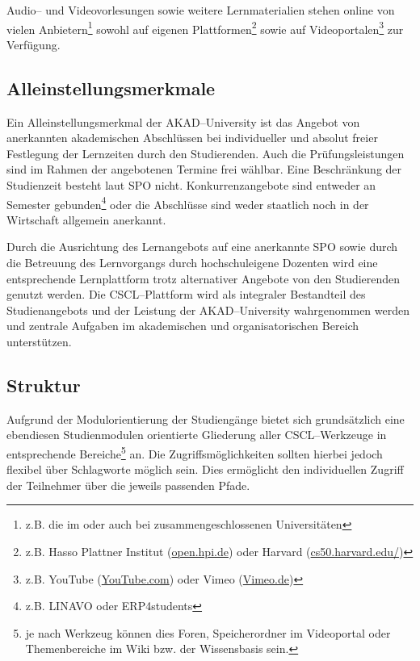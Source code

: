 Audio– und Videovorlesungen sowie weitere Lernmaterialien stehen online von vielen Anbietern\footnote{z.B. die im  oder auch bei  zusammengeschlossenen Universitäten} sowohl auf eigenen Plattformen\footnote{z.B. Hasso Plattner Institut (\url{open.hpi.de}) oder Harvard (\url{cs50.harvard.edu/})} sowie auf Videoportalen\footnote{z.B. YouTube (\url{YouTube.com}) oder Vimeo (\url{Vimeo.de})} zur Verfügung.

\subsection{Alleinstellungsmerkmale} %
\label{sub:alleinstellungsmerkmale_plazierung}
Ein Alleinstellungsmerkmal der AKAD–University ist das Angebot von anerkannten akademischen Abschlüssen bei individueller und absolut freier Festlegung der Lernzeiten durch den Studierenden. Auch die Prüfungsleistungen sind im Rahmen der angebotenen Termine frei wählbar. Eine Beschränkung der Studienzeit besteht laut \ac{SPO} nicht. Konkurrenzangebote sind entweder an Semester gebunden\footnote{z.B. \ac{LINAVO} oder ERP4students} oder die Abschlüsse sind weder staatlich noch in der Wirtschaft allgemein anerkannt.

Durch die Ausrichtung des Lernangebots auf eine anerkannte \ac{SPO} sowie durch die Betreuung des Lernvorgangs durch hochschuleigene Dozenten wird eine entsprechende Lernplattform trotz alternativer Angebote von den Studierenden genutzt werden. Die \ac{CSCL}–Plattform wird als integraler Bestandteil des Studienangebots und der Leistung der AKAD–University wahrgenommen werden und zentrale Aufgaben im akademischen und organisatorischen Bereich unterstützen.

\subsection{Struktur} %
\label{sub:struktur}
Aufgrund der Modulorientierung der Studiengänge bietet sich grundsätzlich eine ebendiesen Studienmodulen orientierte Gliederung aller \ac{CSCL}–Werkzeuge in entsprechende Bereiche\footnote{je nach Werkzeug können dies Foren, Speicherordner im Videoportal oder Themenbereiche im Wiki bzw. der Wissensbasis sein.} an. Die Zugriffsmöglichkeiten sollten hierbei jedoch flexibel über Schlagworte möglich sein. Dies ermöglicht den individuellen Zugriff der Teilnehmer über die jeweils passenden Pfade. 

